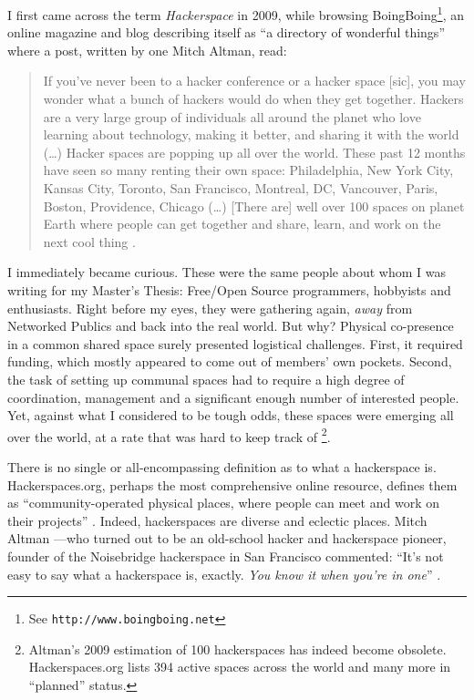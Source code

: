 I first came across the term \textit{Hackerspace} in 2009, while browsing BoingBoing\footnote{See \texttt{http://www.boingboing.net}}, an online magazine and blog describing itself as ``a directory of wonderful things'' where a post, written by one Mitch Altman, read:

\begin{quote}
If you’ve never been to a hacker conference or a hacker space [sic], you may wonder what a bunch of hackers would do when they get together. Hackers are a very large group of individuals all around the planet who love learning about technology, making it better, and sharing it with the world (\ldots) Hacker spaces are popping up all over the world. These past 12 months have seen so many renting their own space: Philadelphia, New York City, Kansas City, Toronto, San Francisco, Montreal, DC, Vancouver, Paris, Boston, Providence, Chicago (\ldots) [There are] well over 100 spaces on planet Earth where people can get together and share, learn, and work on the next cool thing \citep{johnson09}.
\end{quote}

I immediately became curious. These were the same people about whom I was writing for my Master's Thesis: Free/Open Source programmers, hobbyists and enthusiasts. Right before my eyes, they were gathering again, \emph{away} from Networked Publics and back into the real world. But why? Physical co-presence in a common shared space surely presented logistical challenges. First, it required funding, which mostly appeared to come out of members' own pockets. Second, the task of setting up communal spaces had to require a high degree of coordination, management and a significant enough number of interested people. Yet, against what I considered to be tough odds, these spaces were emerging all over the world, at a rate that was hard to keep track of \footnote{Altman's 2009 estimation of 100 hackerspaces has indeed become obsolete. Hackerspaces.org lists 394 active spaces across the world and many more in ``planned'' status.}.

There is no single or all-encompassing definition as to what a hackerspace is. Hackerspaces.org, perhaps the most comprehensive online resource, defines them as ``commu\-nity-operated physical places, where people can meet and work on their projects'' \citep{hackerspaces11}. Indeed, hackerspaces are diverse and eclectic places. Mitch Altman ---who turned out to be an old-school hacker and hackerspace pioneer, founder of the Noisebridge hackerspace in San Francisco commented: ``It's not easy to say what a hackerspace is, exactly. \emph{You know it when you're in one}'' \citep{altman11}.

